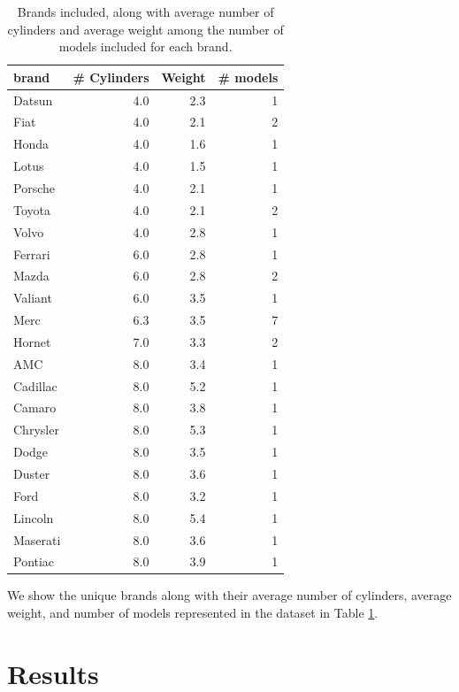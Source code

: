 \documentclass[
  english,
  man,floatsintext]{apa6}
\begin{document}
\begin{table}

\caption{\label{tab:summary-tbl}Brands included, along with average number of cylinders and average weight among the number of models included for each brand.}
\centering
\begin{tabular}[t]{l|r|r|r}
\hline
brand & \# Cylinders & Weight & \# models\\
\hline
Datsun & 4.0 & 2.3 & 1\\
\hline
Fiat & 4.0 & 2.1 & 2\\
\hline
Honda & 4.0 & 1.6 & 1\\
\hline
Lotus & 4.0 & 1.5 & 1\\
\hline
Porsche & 4.0 & 2.1 & 1\\
\hline
Toyota & 4.0 & 2.1 & 2\\
\hline
Volvo & 4.0 & 2.8 & 1\\
\hline
Ferrari & 6.0 & 2.8 & 1\\
\hline
Mazda & 6.0 & 2.8 & 2\\
\hline
Valiant & 6.0 & 3.5 & 1\\
\hline
Merc & 6.3 & 3.5 & 7\\
\hline
Hornet & 7.0 & 3.3 & 2\\
\hline
AMC & 8.0 & 3.4 & 1\\
\hline
Cadillac & 8.0 & 5.2 & 1\\
\hline
Camaro & 8.0 & 3.8 & 1\\
\hline
Chrysler & 8.0 & 5.3 & 1\\
\hline
Dodge & 8.0 & 3.5 & 1\\
\hline
Duster & 8.0 & 3.6 & 1\\
\hline
Ford & 8.0 & 3.2 & 1\\
\hline
Lincoln & 8.0 & 5.4 & 1\\
\hline
Maserati & 8.0 & 3.6 & 1\\
\hline
Pontiac & 8.0 & 3.9 & 1\\
\hline
\end{tabular}
\end{table}

We show the unique brands along with their average number of cylinders, average weight, and number of models represented in the dataset in Table \ref{tab:summary-tbl}.

\hypertarget{results}{%
\section{Results}\label{results}}
\end{document}
